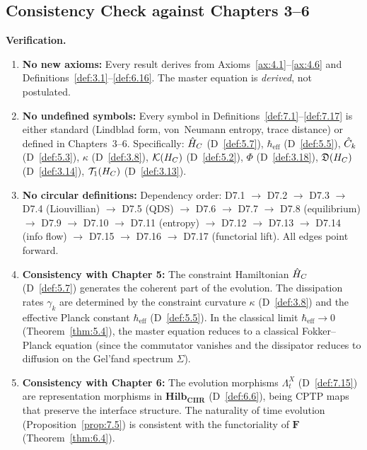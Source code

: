 \subsection{Consistency Check against Chapters 3--6}
\label{sec:ch7:ch36check}

\noindent\textbf{Verification.}
\begin{enumerate}
  \item \textbf{No new axioms:}
    Every result derives from Axioms~\ref{ax:4.1}--\ref{ax:4.6} and
    Definitions~\ref{def:3.1}--\ref{def:6.16}.  The master equation
    is \emph{derived}, not postulated.

  \item \textbf{No undefined symbols:}
    Every symbol in Definitions~\ref{def:7.1}--\ref{def:7.17} is
    either standard (Lindblad form, von~Neumann entropy, trace distance)
    or defined in Chapters~3--6.  Specifically:
    $\hat{H}_C$ (D~\ref{def:5.7}),
    $\hbar_{\mathrm{eff}}$ (D~\ref{def:5.5}),
    $\hat{C}_k$ (D~\ref{def:5.3}),
    $\kappa$ (D~\ref{def:3.8}),
    $\mathcal{K}(H_C)$ (D~\ref{def:5.2}),
    $\Phi$ (D~\ref{def:3.18}),
    $\mathfrak{D}(H_C)$ (D~\ref{def:3.14}),
    $\mathcal{T}_1(H_C)$ (D~\ref{def:3.13}).

  \item \textbf{No circular definitions:}
    Dependency order: D7.1 $\to$ D7.2 $\to$ D7.3 $\to$ D7.4
    (Liouvillian) $\to$ D7.5 (QDS) $\to$ D7.6 $\to$ D7.7 $\to$ D7.8
    (equilibrium) $\to$ D7.9 $\to$ D7.10 $\to$ D7.11 (entropy) $\to$
    D7.12 $\to$ D7.13 $\to$ D7.14 (info flow) $\to$ D7.15 $\to$
    D7.16 $\to$ D7.17 (functorial lift).  All edges point forward.

  \item \textbf{Consistency with Chapter 5:}
    The constraint Hamiltonian $\hat{H}_C$ (D~\ref{def:5.7}) generates
    the coherent part of the evolution.  The dissipation rates
    $\gamma_k$ are determined by the constraint curvature $\kappa$
    (D~\ref{def:3.8}) and the effective Planck constant
    $\hbar_{\mathrm{eff}}$ (D~\ref{def:5.5}).  In the classical limit
    $\hbar_{\mathrm{eff}} \to 0$ (Theorem~\ref{thm:5.4}), the master
    equation reduces to a classical Fokker--Planck equation (since
    the commutator vanishes and the dissipator reduces to diffusion
    on the Gel'fand spectrum $\Sigma$).

  \item \textbf{Consistency with Chapter 6:}
    The evolution morphisms $\Lambda_t^X$ (D~\ref{def:7.15}) are
    representation morphisms in $\mathbf{Hilb_{CIIR}}$
    (D~\ref{def:6.6}), being CPTP maps that preserve the interface
    structure.  The naturality of time evolution
    (Proposition~\ref{prop:7.5}) is consistent with the functoriality
    of $\mathbf{F}$ (Theorem~\ref{thm:6.4}).


\end{enumerate}
